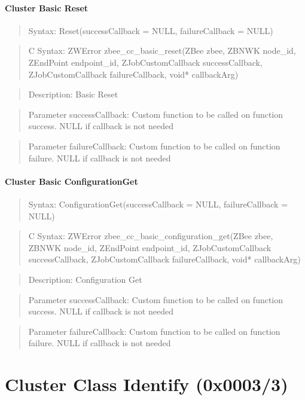 \paragraph{Cluster Basic Reset}
\begin{quote}Syntax: Reset(successCallback = NULL, failureCallback = NULL)\end{quote}
\begin{quote}C Syntax: ZWError zbee\_cc\_basic\_reset(ZBee zbee, ZBNWK node\_id, ZEndPoint endpoint\_id, ZJobCustomCallback successCallback, ZJobCustomCallback failureCallback, void* callbackArg)\end{quote}
\begin{quote}Description: Basic Reset\end{quote}
\begin{quote}Parameter successCallback: Custom function to be called on function success. NULL if callback is not needed\end{quote}
\begin{quote}Parameter failureCallback: Custom function to be called on function failure. NULL if callback is not needed\end{quote}


\paragraph{Cluster Basic ConfigurationGet}
\begin{quote}Syntax: ConfigurationGet(successCallback = NULL, failureCallback = NULL)\end{quote}
\begin{quote}C Syntax: ZWError zbee\_cc\_basic\_configuration\_get(ZBee zbee, ZBNWK node\_id, ZEndPoint endpoint\_id, ZJobCustomCallback successCallback, ZJobCustomCallback failureCallback, void* callbackArg)\end{quote}
\begin{quote}Description: Configuration Get\end{quote}
\begin{quote}Parameter successCallback: Custom function to be called on function success. NULL if callback is not needed\end{quote}
\begin{quote}Parameter failureCallback: Custom function to be called on function failure. NULL if callback is not needed\end{quote}



\section{Cluster Class Identify (0x0003/3)}

